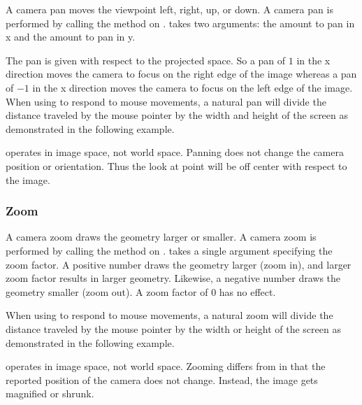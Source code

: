 
A camera pan moves the viewpoint left, right, up, or down. A camera pan is
performed by calling the  method on .
 takes two arguments: the amount to pan in x and the amount
to pan in y.

The pan is given with respect to the projected space. So a pan of $1$ in
the x direction moves the camera to focus on the right edge of the image
whereas a pan of $-1$ in the x direction moves the camera to focus on the
left edge of the image. When using  to respond to mouse
movements, a natural pan will divide the distance traveled by the mouse
pointer by the width and height of the screen as demonstrated in the
following example.


 operates in image space, not world space. Panning does not
change the camera position or orientation. Thus the look at point will be
off center with respect to the image.


\subsubsection{Zoom}


A camera zoom draws the geometry larger or smaller. A camera zoom is
performed by calling the  method on .
 takes a single argument specifying the zoom factor. A
positive number draws the geometry larger (zoom in), and larger zoom factor
results in larger geometry. Likewise, a negative number draws the geometry
smaller (zoom out). A zoom factor of 0 has no effect.

When using  to respond to mouse movements, a natural zoom
will divide the distance traveled by the mouse pointer by the width or
height of the screen as demonstrated in the following example.


 operates in image space, not world space. Zooming differs
from  in that the reported position of the camera does not
change. Instead, the image gets magnified or shrunk.

